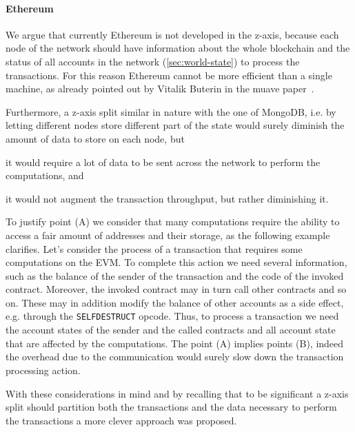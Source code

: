 \paragraph{Ethereum} We argue that currently Ethereum is not developed in the
z-axis, because each node of the network should have information about the whole
blockchain and the status of all accounts in the network 
(\autoref{sec:world-state}) to process the transactions. For this reason 
Ethereum cannot be more efficient than a single machine, as already pointed out 
by Vitalik Buterin in the muave paper~\cite{bib:mauve}.

Furthermore, a z-axis split similar in nature with the one of MongoDB, i.e.
by letting different nodes store different part of the state would surely
diminish the amount of data to store on each node, but
\begin{enumerate*}[label=(\Alph*)]
    \item it would require a lot of data to be sent across the network to 
    perform the computations, and
    \item it would not augment the transaction throughput, but rather 
    diminishing it.
\end{enumerate*}
To justify point (A) we consider that many computations require the ability to
access a fair amount of addresses and their storage, as the following example
clarifies. Let's consider the process of a transaction that requires some 
computations on the EVM. To complete this action we need several information, 
such as the balance of the sender of the transaction and the code of the
invoked contract. Moreover, the invoked contract may in turn call other 
contracts and so on. These may in addition modify the balance of other accounts
as a side effect, e.g. through the \texttt{SELFDESTRUCT} opcode. Thus, to 
process a transaction we need the account states of the sender and the called
contracts and all account state that are affected by the computations. 
The point (A) implies points (B), indeed the overhead due to the communication
would surely slow down the transaction processing action.

With these considerations in mind and by recalling that to be significant a
z-axis split should partition both the transactions and the data necessary to 
perform the transactions a more clever approach was proposed.


